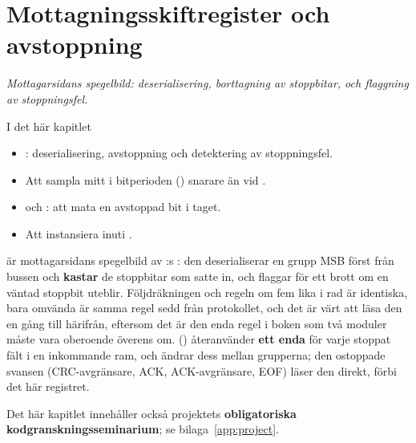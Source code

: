 
\chapter{Mottagningsskiftregister och avstoppning}
\label{c15:ch}

{\large\itshape Mottagarsidans spegelbild: deserialisering, borttagning av stoppbitar, och flaggning
av stoppningsfel.\par}

\begin{chapterbox}{I det här kapitlet}
\begin{itemize}
  \item {}: deserialisering, avstoppning och detektering av stoppningsfel.
  \item Att sampla mitt i bitperioden () snarare än vid .
  \item {} och : att mata  en avstoppad bit i taget.
  \item Att instansiera  inuti .
\end{itemize}
\end{chapterbox}

 är mottagarsidans spegelbild av :s : den
deserialiserar en grupp MSB först från bussen och \textbf{kastar} de stoppbitar som
 satte in, och flaggar för ett brott om en väntad stoppbit uteblir. Följdräkningen
och regeln om fem lika i rad är identiska, bara omvända \textemdash{}  är samma regel sedd
från protokollet, och det är värt att läsa den en gång till härifrån, eftersom det är den enda regel
i boken som två moduler måste vara oberoende överens om.  ()
återanvänder \textbf{ett enda}  för varje stoppat fält i en inkommande ram, och
ändrar dess  mellan grupperna; den ostoppade svansen (CRC-avgränsare, ACK,
ACK-avgränsare, EOF) läser den direkt, förbi det här registret.

Det här kapitlet innehåller också projektets \textbf{obligatoriska kodgranskningsseminarium}; se
bilaga~\ref{app:project}.




